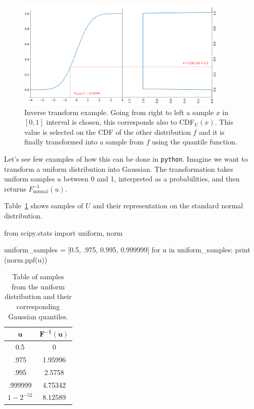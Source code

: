 \begin{figure}[htb]
\centering
\includegraphics[width=0.9\textwidth]{figures/inverse_transform}
\caption{Inverse transform example. Going from right to left a sample $x$ in $[0,1]$ interval is chosen, this corresponds also to CDF$_{\textrm{U}}(x)$. This value is selected on the CDF of the other distribution $f$ and it is finally transformed into a sample from $f$ using the quantile function.}
\label{fig:inverse_transform}
\end{figure}

Let's see few examples of how this can be done in \texttt{python}. Imagine we want to transform a uniform distribution into Gaussian. The transformation takes uniform samples $u$ between 0 and 1, interpreted as a probabilities, and then returns $F_{\textrm{normal}}^{-1}(u)$. 

Table~\ref{tab:transformation} shows samples of $U$ and their representation on the standard normal distribution.

\begin{ipython}
from scipy.stats import uniform, norm

uniform_samples = [0.5, .975, 0.995, 0.999999]
for u in uniform_samples:
    print (norm.ppf(u))
\end{ipython}

\begin{table}[h]
\centering
\begin{tabular}{|c|c|}
\hline
\(\mathbf{u}\) & \(\mathbf{F^{-1}(u)}\) \\
\hline
0.5 & 0 \\
\hline
.975 & 1.95996 \\
\hline
.995 & 2.5758 \\
\hline
.999999 & 4.75342 \\
\hline
\(1-2^{-52}\) & 8.12589 \\
\hline
\end{tabular}
\caption{Table of samples from the uniform distribution and their corresponding Gaussian quantiles.}
\label{tab:transformation}
\end{table}

